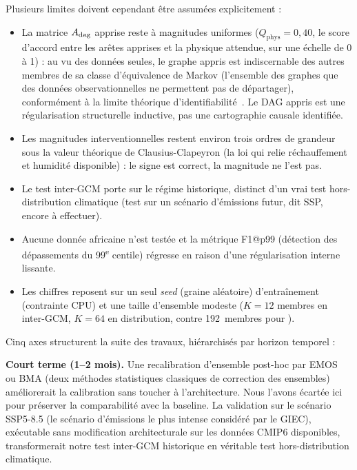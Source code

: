 Plusieurs limites doivent cependant être assumées explicitement :
\begin{itemize}[leftmargin=1.2em, itemsep=2pt]
    \item La matrice $A_{\mathrm{dag}}$ apprise reste à magnitudes uniformes ($Q_{\mathrm{phys}} = 0{,}40$, le score d'accord entre les arêtes apprises et la physique attendue, sur une échelle de 0 à 1) : au vu des données seules, le graphe appris est indiscernable des autres membres de sa classe d'équivalence de Markov (l'ensemble des graphes que des données observationnelles ne permettent pas de départager), conformément à la limite théorique d'identifiabilité~\cite{pearl_causality_2009}. Le DAG appris est une régularisation structurelle inductive, pas une cartographie causale identifiée.
    \item Les magnitudes interventionnelles restent environ trois ordres de grandeur sous la valeur théorique de Clausius-Clapeyron (la loi qui relie réchauffement et humidité disponible) : le signe est correct, la magnitude ne l'est pas.
    \item Le test inter-GCM porte sur le régime historique, distinct d'un vrai test hors-distribution climatique (test sur un scénario d'émissions futur, dit SSP, encore à effectuer).
    \item Aucune donnée africaine n'est testée et la métrique F1@p99 (détection des dépassements du 99\textsuperscript{e} centile) régresse en raison d'une régularisation interne lissante.
    \item Les chiffres reposent sur un seul \emph{seed} (graine aléatoire) d'entraînement (contrainte CPU) et une taille d'ensemble modeste ($K=12$ membres en inter-GCM, $K=64$ en distribution, contre 192~membres pour \CorrDiff{}).
\end{itemize}

\label{concl:persp}

Cinq axes structurent la suite des travaux, hiérarchisés par horizon temporel :

\textbf{Court terme (1--2 mois).} Une recalibration d'ensemble post-hoc par EMOS~\cite{gneiting_emos_2005} ou BMA (deux méthodes statistiques classiques de correction des ensembles) améliorerait la calibration sans toucher à l'architecture. Nous l'avons écartée ici pour préserver la comparabilité avec la baseline. La validation sur le scénario SSP5-8.5 (le scénario d'émissions le plus intense considéré par le GIEC), exécutable sans modification architecturale sur les données CMIP6 disponibles, transformerait notre test inter-GCM historique en véritable test hors-distribution climatique.

